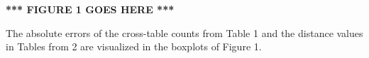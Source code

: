 \documentclass[10pt]{article}
\newif\ifcolor
\begin{document}


\textbf{*** FIGURE 1 GOES HERE ***}

The absolute errors of the cross-table counts from Table 1 and the distance values in Tables from 2 are visualized in the boxplots of Figure 1.

\end{document}
